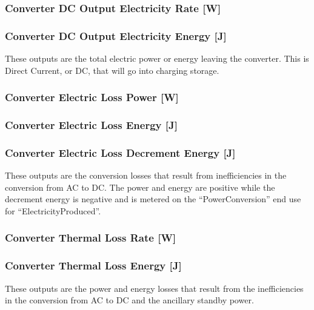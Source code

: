 \subsubsection{Converter DC Output Electricity Rate {[}W{]}}\label{converter-dc-output-electric-power-w}

\subsubsection{Converter DC Output Electricity Energy {[}J{]}}\label{converter-dc-output-electric-energy-j}

These outputs are the total electric power or energy leaving the converter. This is Direct Current, or DC, that will go into charging storage.

\subsubsection{Converter Electric Loss Power {[}W{]}}\label{converter-electric-loss-power-w}

\subsubsection{Converter Electric Loss Energy {[}J{]}}\label{converter-electric-loss-energy-j}

\subsubsection{Converter Electric Loss Decrement Energy {[}J{]}}\label{converter-electric-loss-decrement-energy-j}

These outputs are the conversion losses that result from inefficiencies in the conversion from AC to DC. The power and energy are positive while the decrement energy is negative and is metered on the ``PowerConversion'' end use for ``ElectricityProduced''.

\subsubsection{Converter Thermal Loss Rate {[}W{]}}\label{converter-thermal-loss-rate-w}

\subsubsection{Converter Thermal Loss Energy {[}J{]}}\label{converter-thermal-loss-energy-j}

These outputs are the power and energy losses that result from the inefficiencies in the conversion from AC to DC and the ancillary standby power.


